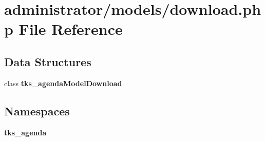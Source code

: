 \section{administrator/models/download.php File Reference}
\label{administrator_2models_2download_8php}
\subsection*{Data Structures}
\begin{DoxyCompactItemize}
\item 
class \textbf{ tks\+\_\+agenda\+Model\+Download}
\end{DoxyCompactItemize}
\subsection*{Namespaces}
\begin{DoxyCompactItemize}
\item 
 \textbf{ tks\+\_\+agenda}
\end{DoxyCompactItemize}
